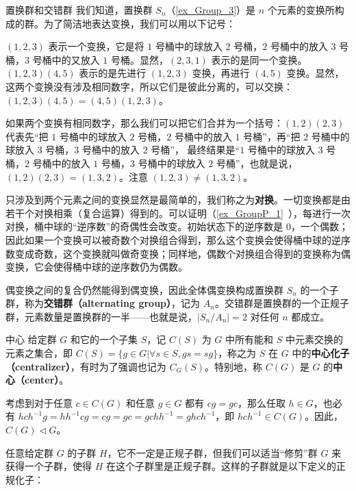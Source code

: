\begin{example}{置换群和交错群}\label{ex_NormSG_5}
我们知道，置换群 $S_n$（\autoref{ex_Group_3}）是 $n$ 个元素的变换所构成的群。为了简洁地表达变换，我们可以用以下记号：

$(1,2,3)$ 表示一个变换，它是将 $1$ 号桶中的球放入 $2$ 号桶，$2$ 号桶中的放入 $3$ 号桶，$3$ 号桶中的又放入 $1$ 号桶。显然，$(2,3,1)$ 表示的是同一个变换。$(1,2,3)(4,5)$ 表示的是先进行 $(1,2,3)$ 变换，再进行 $(4,5)$ 变换。显然，这两个变换没有涉及相同数字，所以它们是彼此分离的，可以交换：$(1,2,3)(4,5)=(4,5)(1,2,3)$。

如果两个变换有相同数字，那么我们可以把它们合并为一个括号：$(1,2)(2,3)$ 代表先“把 $1$ 号桶中的球放入 $2$ 号桶，$2$ 号桶中的放入 $1$ 号桶”，再“把 $2$ 号桶中的球放入 $3$ 号桶，$3$ 号桶中的放入 $2$ 号桶”， 最终结果是“$1$ 号桶中的球放入 $3$ 号桶，$2$ 号桶中的放入 $1$ 号桶，$3$ 号桶中的球放入 $2$ 号桶”，也就是说，$(1,2)(2,3)=(1,3,2)$。注意 $(1,2,3)\not=(1,3,2)$。

只涉及到两个元素之间的变换显然是最简单的，我们称之为\textbf{对换}。一切变换都是由若干个对换相乘（复合运算）得到的。可以证明（\autoref{ex_GroupP_1}~），每进行一次对换，桶中球的“逆序数”的奇偶性会改变。初始状态下的逆序数是 $0$，一个偶数；因此如果一个变换可以被奇数个对换组合得到，那么这个变换会使得桶中球的逆序数变成奇数，这个变换就叫做奇变换；同样地，偶数个对换组合得到的变换称为偶变换，它会使得桶中球的逆序数仍为偶数。

偶变换之间的复合仍然能得到偶变换，因此全体偶变换构成置换群 $S_n$ 的一个子群，称为\textbf{交错群（alternating group）}，记为 $A_n$。交错群是置换群的一个正规子群，元素数量是置换群的一半——也就是说，$|S_n/A_n|=2$ 对任何 $n$ 都成立。
\end{example}

\begin{example}{中心}\label{ex_NormSG_1}
给定群 $G$ 和它的一个子集 $S$，记 $C(S)$ 为 $G$ 中所有能和 $S$ 中元素交换的元素之集合，即 $C(S)=\{g\in G|\forall s\in S, gs=sg\}$，称之为 $S$ 在 $G$ 中的\textbf{中心化子（centralizer）}，有时为了强调也记为 $C_G(S)$。特别地，称 $C(G)$ 是 $G$ 的\textbf{中心（center）}。

考虑到对于任意 $c\in C(G)$ 和任意 $g\in G$ 都有 $cg=gc$，那么任取 $h\in G$，也必有 $hch^{-1}g=hh^{-1}cg=cg=gc=gchh^{-1}=ghch^{-1}$，即 $hch^{-1}\in C(G)$。因此，$C(G)\lhd G$。
\end{example}


任意给定群 $G$ 的子群 $H$，它不一定是正规子群，但我们可以适当“修剪”群 $G$ 来获得一个子群，使得 $H$ 在这个子群里是正规子群。这样的子群就是以下定义的正规化子：


